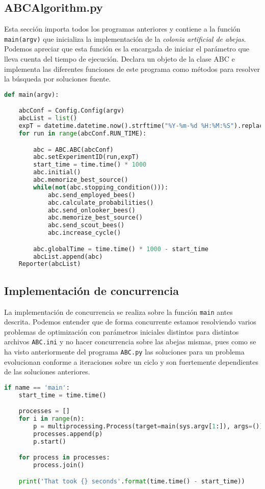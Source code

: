 \documentclass{article}
\begin{document}
\subsection*{ABCAlgorithm.py}

Esta sección importa todos los programas anteriores y contiene a la función \texttt{main(argv)} que inicializa la implementación de la \textit{colonia artificial de abejas}. Podemos apreciar que esta función es la encargada de iniciar el parámetro que lleva cuenta del tiempo de ejecución. Declara un objeto de la clase ABC e implementa las diferentes funciones de este programa como métodos para resolver la búsqueda por soluciones fuente. 

\begin{lstlisting}[language=Python]
def main(argv):

    abcConf = Config.Config(argv)
    abcList = list()
    expT = datetime.datetime.now().strftime("%Y-%m-%d %H:%M:%S").replace(" ","").replace(":","")
    for run in range(abcConf.RUN_TIME):

        abc = ABC.ABC(abcConf)
        abc.setExperimentID(run,expT)
        start_time = time.time() * 1000
        abc.initial()
        abc.memorize_best_source()
        while(not(abc.stopping_condition())):
            abc.send_employed_bees()
            abc.calculate_probabilities()
            abc.send_onlooker_bees()
            abc.memorize_best_source()
            abc.send_scout_bees()
            abc.increase_cycle()

        abc.globalTime = time.time() * 1000 - start_time
        abcList.append(abc)
    Reporter(abcList)
\end{lstlisting}


\subsection*{Implementación de concurrencia}

La implementación de concurrencia se realiza sobre la función \texttt{main} antes descrita. Podemos entender que de forma concurrente estamos resolviendo varios problemas de optimización con parámetros iniciales distintos para distintos archivos \texttt{ABC.ini} y no hacer concurrencia sobre las abejas mismas, pues como se ha visto anteriormente del programa \texttt{ABC.py} las soluciones para un problema evolucionan conforme a iteraciones sobre un ciclo y son fuertemente dependientes de las soluciones anteriores. 

\begin{lstlisting}[language=Python]
if name == 'main':
    start_time = time.time()

    processes = []
    for i in range(n):
        p = multiprocessing.Process(target=main(sys.argv[1:]), args=())
        processes.append(p)
        p.start()

    for process in processes:
        process.join()

    print('That took {} seconds'.format(time.time() - start_time))
\end{lstlisting}
\end{document}
